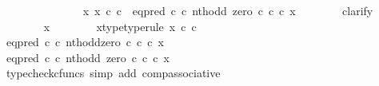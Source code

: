 \begin{isabellebody}
\ {\isachardoublequoteopen}{\isachardot}{\kern0pt}{\isachardot}{\kern0pt}{\isachardot}{\kern0pt}\ {\isacharequal}{\kern0pt}\ {\isasymf}{\isachardoublequoteclose}\isanewline
\ \ \isamarkupfalse%
\ {\isacharminus}{\kern0pt}\isanewline
\ \ \ \ \isamarkupfalse%
\ {\isachardoublequoteopen}{\isasymnexists}\ x{\isachardot}{\kern0pt}\ x\ {\isasymin}\isactrlsub c\ {\isasymnat}\isactrlsub c\ {\isasymand}\ {\isacharparenleft}{\kern0pt}eq{\isacharunderscore}{\kern0pt}pred\ {\isasymnat}\isactrlsub c\ {\isasymcirc}\isactrlsub c\ {\isasymlangle}nth{\isacharunderscore}{\kern0pt}odd{\isacharcomma}{\kern0pt}\ zero\ {\isasymcirc}\isactrlsub c\ {\isasymbeta}\isactrlbsub {\isasymnat}\isactrlsub c\isactrlesub {\isasymrangle}{\isacharparenright}{\kern0pt}\ {\isasymcirc}\isactrlsub c\ x\ {\isacharequal}{\kern0pt}\ {\isasymt}{\isachardoublequoteclose}\isanewline
\ \ \ \ \isamarkupfalse%
\ clarify\isanewline
\ \ \ \ \ \ \isamarkupfalse%
\ x\isanewline
\ \ \ \ \ \ \isamarkupfalse%
\ x{\isacharunderscore}{\kern0pt}type{\isacharbrackleft}{\kern0pt}type{\isacharunderscore}{\kern0pt}rule{\isacharbrackright}{\kern0pt}{\isacharcolon}{\kern0pt}\ {\isachardoublequoteopen}x\ {\isasymin}\isactrlsub c\ {\isasymnat}\isactrlsub c{\isachardoublequoteclose}\isanewline
\ \ \ \ \ \ \isamarkupfalse%
\ {\isachardoublequoteopen}{\isacharparenleft}{\kern0pt}eq{\isacharunderscore}{\kern0pt}pred\ {\isasymnat}\isactrlsub c\ {\isasymcirc}\isactrlsub c\ {\isasymlangle}nth{\isacharunderscore}{\kern0pt}odd{\isacharcomma}{\kern0pt}zero\ {\isasymcirc}\isactrlsub c\ {\isasymbeta}\isactrlbsub {\isasymnat}\isactrlsub c\isactrlesub {\isasymrangle}{\isacharparenright}{\kern0pt}\ {\isasymcirc}\isactrlsub c\ x\ {\isacharequal}{\kern0pt}\ {\isasymt}{\isachardoublequoteclose}\isanewline
\ \ \ \ \ \ \isamarkupfalse%
\ \isamarkupfalse%
\ {\isachardoublequoteopen}eq{\isacharunderscore}{\kern0pt}pred\ {\isasymnat}\isactrlsub c\ {\isasymcirc}\isactrlsub c\ {\isasymlangle}nth{\isacharunderscore}{\kern0pt}odd{\isacharcomma}{\kern0pt}\ zero\ {\isasymcirc}\isactrlsub c\ {\isasymbeta}\isactrlbsub {\isasymnat}\isactrlsub c\isactrlesub {\isasymrangle}\ {\isasymcirc}\isactrlsub c\ x\ {\isacharequal}{\kern0pt}\ {\isasymt}{\isachardoublequoteclose}\isanewline
\ \ \ \ \ \ \ \ \isamarkupfalse%
\ {\isacharparenleft}{\kern0pt}typecheck{\isacharunderscore}{\kern0pt}cfuncs{\isacharcomma}{\kern0pt}\ simp\ add{\isacharcolon}{\kern0pt}\ comp{\isacharunderscore}{\kern0pt}associative{}{\isacharparenright}{\kern0pt}\isanewline

\end{isabellebody}
